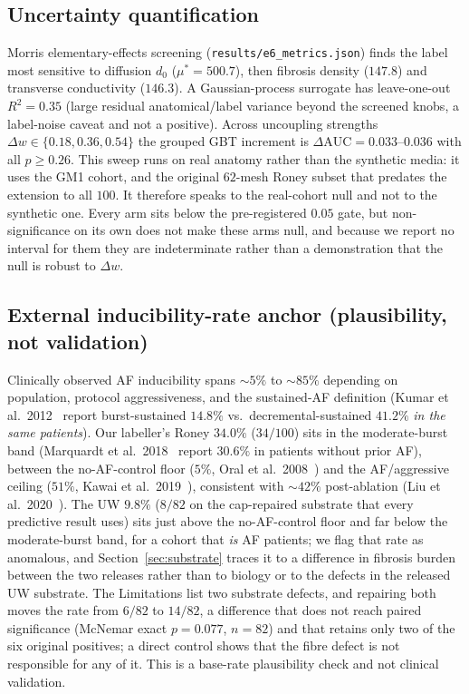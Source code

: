 \documentclass[11pt]{article}
\theoremstyle{definition}
\newcommand{\dAUC}{\Delta\mathrm{AUC}}
\newcommand{\code}[1]{\texttt{#1}}
\begin{document}
\subsection{Uncertainty quantification}
Morris elementary-effects screening (\code{results/e6\_metrics.json}) finds the
label most sensitive to diffusion $d_0$ ($\mu^\ast=500.7$), then fibrosis density
($147.8$) and transverse conductivity ($146.3$). A Gaussian-process surrogate has
leave-one-out $R^2=0.35$ (large residual anatomical/label variance beyond the
screened knobs, a label-noise caveat and not a positive). Across uncoupling
strengths $\Delta w\in\{0.18,0.36,0.54\}$ the grouped GBT
increment is $\dAUC=0.033$--$0.036$ with all $p\geq0.26$. This sweep runs on real
anatomy rather than the synthetic media: it uses the GM1 cohort, and the original
$62$-mesh Roney subset that predates the extension to all $100$. It therefore
speaks to the real-cohort null and not to the synthetic one. Every arm
sits below the pre-registered $0.05$ gate, but non-significance on its own does
not make these arms null, and because we report no interval for them they are
indeterminate rather than a demonstration that the null is robust to $\Delta w$.

\subsection{External inducibility-rate anchor (plausibility, not validation)}
Clinically observed AF inducibility spans $\sim\!5\%$ to $\sim\!85\%$ depending on
population, protocol aggressiveness, and the sustained-AF definition (Kumar et
al.\ 2012~\cite{kumar2012} report burst-sustained $14.8\%$ vs.\
decremental-sustained $41.2\%$ \emph{in the same patients}). Our labeller's Roney
$34.0\%$ ($34/100$) sits in the moderate-burst band (Marquardt et al.\
2018~\cite{marquardt2018} report $30.6\%$ in patients without prior AF), between
the no-AF-control floor ($5\%$, Oral et al.\ 2008~\cite{oral2008}) and the
AF/aggressive ceiling ($51\%$, Kawai et al.\ 2019~\cite{kawai2019}), consistent
with $\sim\!42\%$ post-ablation (Liu et al.\ 2020~\cite{liu2020}). The UW
$9.8\%$ ($8/82$ on the cap-repaired substrate that every predictive result
uses) sits just above the no-AF-control floor and far below the moderate-burst
band, for a cohort that \emph{is} AF patients; we flag that rate as anomalous,
and Section~\ref{sec:substrate} traces it to a difference in fibrosis burden
between the two releases rather than to biology or to the defects in the released
UW substrate. The Limitations list two substrate defects, and repairing both
moves the rate from $6/82$ to $14/82$, a difference that does not reach paired
significance (McNemar exact $p=0.077$, $n=82$) and that retains only two of the
six original positives; a direct control shows that the fibre defect is not
responsible for any of it. This is a base-rate plausibility check and not
clinical validation.
\end{document}
